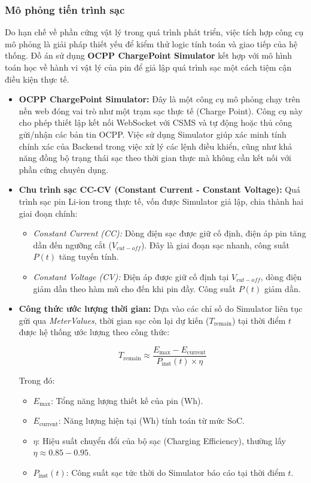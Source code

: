 \subsubsection{Mô phỏng tiến trình sạc}
Do hạn chế về phần cứng vật lý trong quá trình phát triển, việc tích hợp công cụ mô phỏng là giải pháp thiết yếu để kiểm thử logic tính toán và giao tiếp của hệ thống. Đồ án sử dụng \textbf{OCPP ChargePoint Simulator} kết hợp với mô hình toán học về hành vi vật lý của pin để giả lập quá trình sạc một cách tiệm cận điều kiện thực tế.

\begin{itemize}
    \item \textbf{OCPP ChargePoint Simulator:} Đây là một công cụ mô phỏng chạy trên nền web đóng vai trò như một trạm sạc thực tế (Charge Point). Công cụ này cho phép thiết lập kết nối WebSocket với CSMS và tự động hoặc thủ công gửi/nhận các bản tin OCPP. Việc sử dụng Simulator giúp xác minh tính chính xác của Backend trong việc xử lý các lệnh điều khiển, cũng như khả năng đồng bộ trạng thái sạc theo thời gian thực mà không cần kết nối với phần cứng chuyên dụng.
    
    \item \textbf{Chu trình sạc CC-CV (Constant Current - Constant Voltage):} Quá trình sạc pin Li-ion trong thực tế, vốn được Simulator giả lập, chia thành hai giai đoạn chính:
    \begin{itemize}
        \item \textit{Constant Current (CC):} Dòng điện sạc được giữ cố định, điện áp pin tăng dần đến ngưỡng cắt ($V_{cut-off}$). Đây là giai đoạn sạc nhanh, công suất $P(t)$ tăng tuyến tính.
        \item \textit{Constant Voltage (CV):} Điện áp được giữ cố định tại $V_{cut-off}$, dòng điện giảm dần theo hàm mũ cho đến khi pin đầy. Công suất $P(t)$ giảm dần.
    \end{itemize}
    
    \item \textbf{Công thức ước lượng thời gian:} Dựa vào các chỉ số do Simulator liên tục gửi qua \textit{MeterValues}, thời gian sạc còn lại dự kiến ($T_{\text{remain}}$) tại thời điểm $t$ được hệ thống ước lượng theo công thức:
    
    $$ T_{\text{remain}} \approx \frac{E_{\text{max}} - E_{\text{current}}}{P_{\text{inst}}(t) \times \eta} $$
    
    Trong đó:
    \begin{itemize}
        \item $E_{\text{max}}$: Tổng năng lượng thiết kế của pin (Wh).
        \item $E_{\text{current}}$: Năng lượng hiện tại (Wh) tính toán từ mức SoC.
        \item $\eta$: Hiệu suất chuyển đổi của bộ sạc (Charging Efficiency), thường lấy $\eta \approx 0.85 - 0.95$.
        \item $P_{\text{inst}}(t)$: Công suất sạc tức thời do Simulator báo cáo tại thời điểm $t$.
    \end{itemize}
\end{itemize}

